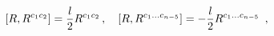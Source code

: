 \begin{equation}
\label{normal} [R, R^{c_1c_2}]={l\over2}R^{c_1c_2}\, , ~~~ [R, R^{c_1\ldots
c_{n-5}}]=-{l\over 2} R^{c_1\dots c_{n-5}}~\,  ,
\end{equation} 
